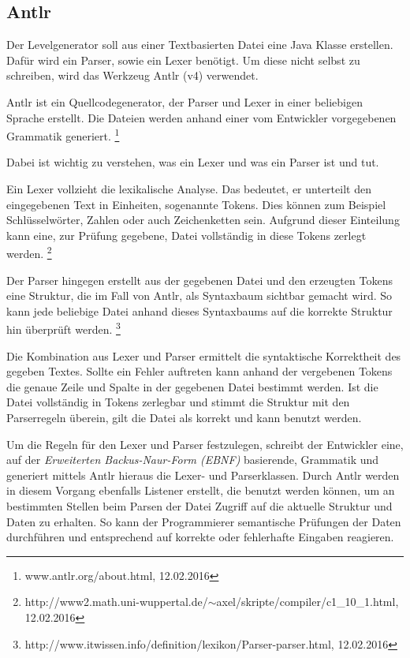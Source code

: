 \subsection{Antlr}

Der Levelgenerator soll aus einer Textbasierten Datei eine Java Klasse erstellen. Dafür wird ein Parser, sowie ein Lexer benötigt. Um diese nicht selbst zu schreiben, wird das Werkzeug Antlr (v4) verwendet.

Antlr ist ein Quellcodegenerator, der Parser und Lexer in einer beliebigen Sprache erstellt. Die Dateien werden anhand einer vom Entwickler vorgegebenen Grammatik generiert. \footnote{www.antlr.org/about.html, 12.02.2016} 

Dabei ist wichtig zu verstehen, was ein Lexer und was ein Parser ist und tut. 

Ein Lexer vollzieht die lexikalische Analyse. Das bedeutet, er unterteilt den eingegebenen Text in Einheiten, sogenannte Tokens. Dies können zum Beispiel Schlüsselwörter, Zahlen oder auch Zeichenketten sein. Aufgrund dieser Einteilung kann eine, zur Prüfung gegebene, Datei vollständig in diese Tokens zerlegt werden. 
\footnote{http://www2.math.uni-wuppertal.de/$\sim$axel/skripte/compiler/c1\_10\_1.html, 12.02.2016} 

Der Parser hingegen erstellt aus der gegebenen Datei und den erzeugten Tokens eine Struktur, die im Fall von Antlr, als Syntaxbaum sichtbar gemacht wird. So kann jede beliebige Datei anhand dieses Syntaxbaums auf die korrekte Struktur hin überprüft werden. \footnote{http://www.itwissen.info/definition/lexikon/Parser-parser.html, 12.02.2016}

Die Kombination aus Lexer und Parser ermittelt die syntaktische Korrektheit des gegeben Textes. Sollte ein Fehler auftreten kann anhand der vergebenen Tokens die genaue Zeile und Spalte in der gegebenen Datei bestimmt werden. Ist die Datei vollständig in Tokens zerlegbar und stimmt die Struktur mit den Parserregeln überein, gilt die Datei als korrekt und kann benutzt werden.

Um die Regeln für den Lexer und Parser festzulegen, schreibt der Entwickler eine, auf der \textit{Erweiterten Backus-Naur-Form (EBNF)} basierende, Grammatik und generiert mittels Antlr hieraus die Lexer- und Parserklassen. Durch Antlr werden in diesem Vorgang ebenfalls Listener erstellt, die benutzt werden können, um an bestimmten Stellen beim Parsen der Datei Zugriff auf die aktuelle Struktur und Daten zu erhalten. So kann der Programmierer semantische Prüfungen der Daten durchführen und entsprechend auf korrekte oder fehlerhafte Eingaben reagieren.


